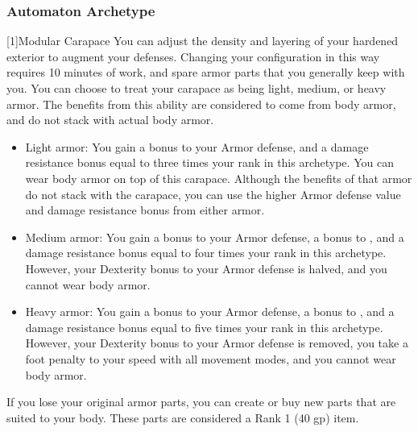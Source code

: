         \subsubsection{Automaton Archetype}

            [1]{Modular Carapace} You can adjust the density and layering of your hardened exterior to augment your defenses.
            Changing your configuration in this way requires 10 minutes of work, and spare armor parts that you generally keep with you.
            You can choose to treat your carapace as being light, medium, or heavy armor.
            The benefits from this ability are considered to come from body armor, and do not stack with actual body armor.

            \begin{itemize}
                \item Light armor: You gain a  bonus to your Armor defense, and a damage resistance bonus equal to three times your rank in this archetype.
                    You can wear body armor on top of this carapace.
                    Although the benefits of that armor do not stack with the carapace, you can use the higher Armor defense value and damage resistance bonus from either armor.
                \item Medium armor: You gain a  bonus to your Armor defense, a  bonus to , and a damage resistance bonus equal to four times your rank in this archetype.
                    However, your Dexterity bonus to your Armor defense is halved, and you cannot wear body armor.
                \item Heavy armor: You gain a  bonus to your Armor defense, a  bonus to , and a damage resistance bonus equal to five times your rank in this archetype.
                    However, your Dexterity bonus to your Armor defense is removed, you take a  foot penalty to your speed with all movement modes, and you cannot wear body armor.
            \end{itemize}

            If you lose your original armor parts, you can create or buy new parts that are suited to your body.
            These parts are considered a Rank 1 (40 gp) item.

